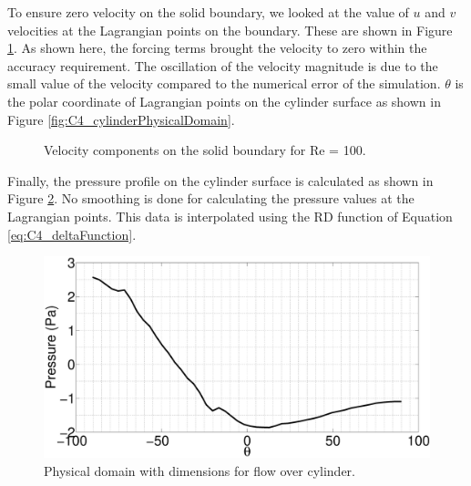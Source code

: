 %
To ensure zero velocity on the solid boundary, we looked at the value of $u$ and $v$ velocities at the Lagrangian points on the boundary. These are shown in Figure \ref{fig:C4_fluidVelocityOnCylinder}. As shown here, the forcing terms brought the velocity to zero within the accuracy requirement. The oscillation of the velocity magnitude is due to the small value of the velocity compared to the numerical error of the simulation. $\theta$ is the polar coordinate of Lagrangian points on the cylinder surface as shown in Figure \ref{fig:C4_cylinderPhysicalDomain}.
%
\begin{figure}[H]
    \centering
    \quad
    \caption{Velocity components on the solid boundary for Re = 100.}
    \label{fig:C4_fluidVelocityOnCylinder}
\end{figure}
%
Finally, the pressure profile on the cylinder surface is calculated as shown in Figure \ref{fig:C4_pressureOnSurfaceCylinder}. No smoothing is done for calculating the pressure values at the Lagrangian points. This data is interpolated using the RD function of Equation \eqref{eq:C4_deltaFunction}.
%
\begin{figure}[H]
    \centering
    \includegraphics[width=12.00cm]{Chapter_4/figure/flow_over_cylinder/p_on_boundary_RE100.eps}
    \caption{Physical domain with dimensions for flow over cylinder.}
    \label{fig:C4_pressureOnSurfaceCylinder}
\end{figure}

